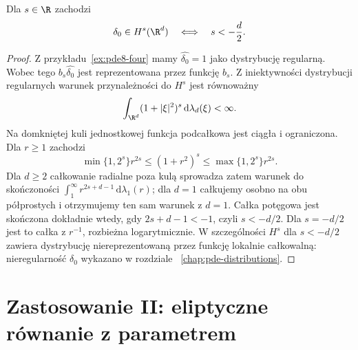 \begin{wniosek}
\label{cor:pde8-delta-Hs}
Dla $s\in\R$ zachodzi
\[
 \delta_0\in H^s(\R^d)\quad\Longleftrightarrow\quad
 s<-\frac d2.
\]
\end{wniosek}
\begin{proof}
Z przykładu~\ref{ex:pde8-four} mamy
$\widehat{\delta_0}=1$ jako dystrybucję regularną.
Wobec tego $b_s\widehat{\delta_0}$ jest
reprezentowana przez funkcję $b_s$.
Z iniektywności dystrybucji regularnych
warunek przynależności do $H^s$ jest równoważny
\[
 \int_{\R^d}(1+|\xi|^2)^s\,
 \mathrm d\lambda_d(\xi)<\infty.
\]
Na domkniętej kuli jednostkowej funkcja podcałkowa
jest ciągła i ograniczona. Dla $r\ge1$ zachodzi
\[
 \min\{1,2^s\}r^{2s}\le(1+r^2)^s
 \le\max\{1,2^s\}r^{2s}.
\]
Dla $d\ge2$ całkowanie radialne poza kulą
sprowadza zatem warunek do skończoności
$\int_1^\infty r^{2s+d-1}\,\mathrm d\lambda_1(r)$;
dla $d=1$ całkujemy osobno na obu półprostych
i otrzymujemy ten sam warunek z $d=1$.
Całka potęgowa jest skończona dokładnie wtedy,
gdy $2s+d-1<-1$, czyli $s<-d/2$.
Dla $s=-d/2$ jest to całka z $r^{-1}$,
rozbieżna logarytmicznie. W szczególności
$H^s$ dla $s<-d/2$ zawiera dystrybucję
niereprezentowaną przez funkcję lokalnie całkowalną:
nieregularność $\delta_0$ wykazano w rozdziale
~\ref{chap:pde-distributions}.
\end{proof}

\section{Zastosowanie II: eliptyczne równanie z parametrem}
\label{sec:pde8-elliptic}

